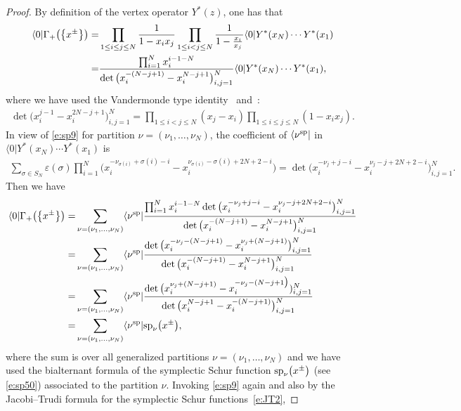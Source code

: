 \documentclass[pdftex]{sigma}
\numberwithin{equation}{section}
\begin{document}
\begin{proof}
By definition of the vertex operator $Y^*(z)$, one has that
\begin{align*}%
\notag\langle 0|\Gamma_+\big(\big\{x^{\pm}\big\}\big)=&\prod_{1\leq i\leq j\leq N}\frac{1}{1-x_ix_j}\prod_{1\leq i<j\leq N}\frac{1}{1-\frac{x_i}{x_j}}\langle 0|Y^*(x_N)\cdots Y^*(x_1)\\
=&\frac{\prod^{N}_{i=1}x^{i-1-N}_i}{\det\big(x^{-(N-j+1)}_i-x^{N-j+1}_i\big)^N_{i,j=1}}\langle 0|Y^*(x_N)\cdots Y^*(x_1),
\end{align*}
where we have used the Vandermonde type identity~\cite[formula~(4.6)]{JN2015} and~\cite[p.~229]{Wey1946}:
\begin{align*}%
\det\big(x^{j-1}_i-x^{2N-j+1}_i\big)^N_{i,j=1}=\prod_{1\leq i<j\leq N}(x_j-x_i)\prod_{1\leq i\leq j\leq N}(1-x_ix_j).
\end{align*}
In view of \eqref{e:sp9} for partition $\nu=(\nu_1,\dots,\nu_N)$, the coefficient of $\langle\nu^{\rm sp}|$ in $\langle 0|Y^*(x_N)\cdots Y^*(x_1)$ is
\begin{align*}
\sum_{\sigma\in S_N}\varepsilon(\sigma)\prod^{N}_{i=1}\big(x^{-\nu_{\sigma(i)}+\sigma(i)-i}_i-x^{\nu_{\sigma(i)}-\sigma(i)+2N+2-i}_i\big) = \det\big(x^{-\nu_j+j-i}_i-x^{\nu_j-j+2N+2-i}_i\big)^N_{i,j=1}.
\end{align*}
Then we have
\begin{align}\label{e:sp12}
\notag\langle 0|\Gamma_+\big(\big\{x^{\pm}\big\}\big)
=&\sum_{\nu=(\nu_1,\dots,\nu_N)}\langle\nu^{\rm sp}|\frac{\prod^{N}_{i=1}x^{i-1-N}_i\det\big(x^{-\nu_j+j-i}_i-x^{\nu_j-j+2N+2-i}_i\big)^N_{i,j=1}}{\det\big(x^{-(N-j+1)}_i-x^{N-j+1}_i\big)^N_{i,j=1}}\\
\notag=&\sum_{\nu=(\nu_1,\dots,\nu_N)}\langle\nu^{\rm sp}|\frac{\det\big(x^{-\nu_j-(N-j+1)}_i-x^{\nu_j+(N-j+1)}_i\big)^N_{i,j=1}}{\det\big(x^{-(N-j+1)}_i-x^{N-j+1}_i\big)^N_{i,j=1}}\\
\notag=&\sum_{\nu=(\nu_1,\dots,\nu_N)}\langle\nu^{\rm sp}|\frac{\det\big(x^{\nu_j+(N-j+1)}_i-x^{-\nu_j-(N-j+1\big)}_i)^N_{i,j=1}}{\det\big(x^{N-j+1}_i-x^{-(N-j+1)}_i\big)^N_{i,j=1}}\\
=&\sum_{\nu=(\nu_1,\dots,\nu_N)}\langle\nu^{\rm sp}|{\rm sp}_\nu\big(x^{\pm}\big),
\end{align}
where the sum is over all generalized partitions $\nu=(\nu_1,\dots,\nu_N)$ and we have used the bialternant formula of the symplectic Schur function ${\rm sp}_\nu\big(x^{\pm}\big)$ (see \eqref{e:sp50}) associated to the partition $\nu$. Invoking \eqref{e:sp9} again and also by the Jacobi--Trudi formula for the symplectic Schur functions~\eqref{e:JT2},

\end{proof}
\end{document}
